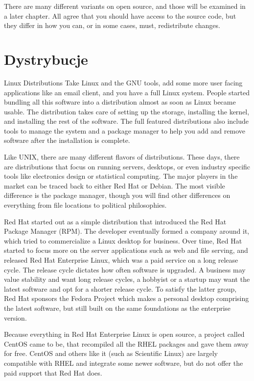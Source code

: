 \documentclass[a4paper,titlepage,12pt]{mwart}
\begin{document}
There are many different variants on open source, and those will be examined in a later chapter. All agree that you should have access to the source code, but they differ in how you can, or in some cases, must, redistribute changes.
\section{Dystrybucje}
Linux Distributions
Take Linux and the GNU tools, add some more user facing applications like an email client, and you have a full Linux system. People started bundling all this software into a distribution almost as soon as Linux became usable. The distribution takes care of setting up the storage, installing the kernel, and installing the rest of the software. The full featured distributions also include tools to manage the system and a package manager to help you add and remove software after the installation is complete.

Like UNIX, there are many different flavors of distributions. These days, there are distributions that focus on running servers, desktops, or even industry specific tools like electronics design or statistical computing. The major players in the market can be traced back to either Red Hat or Debian. The most visible difference is the package manager, though you will find other differences on everything from file locations to political philosophies.

Red Hat started out as a simple distribution that introduced the Red Hat Package Manager (RPM). The developer eventually formed a company around it, which tried to commercialize a Linux desktop for business. Over time, Red Hat started to focus more on the server applications such as web and file serving, and released Red Hat Enterprise Linux, which was a paid service on a long release cycle. The release cycle dictates how often software is upgraded. A business may value stability and want long release cycles, a hobbyist or a startup may want the latest software and opt for a shorter release cycle. To satisfy the latter group, Red Hat sponsors the Fedora Project which makes a personal desktop comprising the latest software, but still built on the same foundations as the enterprise version.

Because everything in Red Hat Enterprise Linux is open source, a project called CentOS came to be, that recompiled all the RHEL packages and gave them away for free. CentOS and others like it (such as Scientific Linux) are largely compatible with RHEL and integrate some newer software, but do not offer the paid support that Red Hat does.
\end{document}
